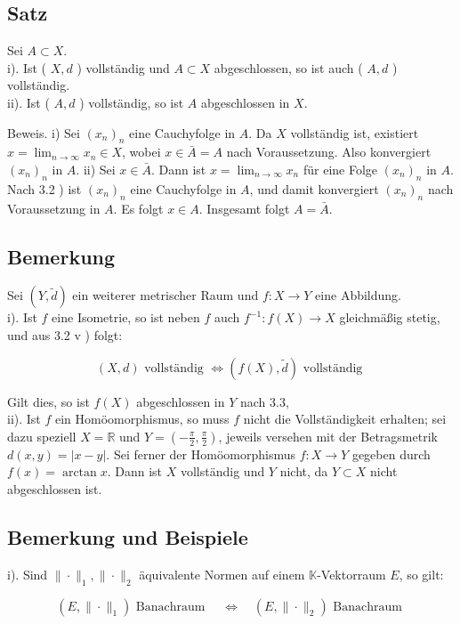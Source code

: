 \documentclass[10pt, letterpaper]{article}
\begin{document}
\subsection*{Satz}
Sei $A \subset X$.\\
i). Ist ( $X, d$ ) vollständig und $A \subset X$ abgeschlossen, so ist auch ( $A, d$ ) vollständig.\\
ii). Ist ( $A, d$ ) vollständig, so ist $A$ abgeschlossen in $X$.

Beweis. i) Sei $\left(x_{n}\right)_{n}$ eine Cauchyfolge in $A$. Da $X$ vollständig ist, existiert $x= \lim _{n \rightarrow \infty} x_{n} \in X$, wobei $x \in \bar{A}=A$ nach Voraussetzung. Also konvergiert $\left(x_{n}\right)_{n}$ in $A$. ii) Sei $x \in \bar{A}$. Dann ist $x=\lim _{n \rightarrow \infty} x_{n}$ für eine Folge $\left(x_{n}\right)_{n}$ in $A$. Nach 3.2 ) ist $\left(x_{n}\right)_{n}$ eine Cauchyfolge in $A$, und damit konvergiert $\left(x_{n}\right)_{n}$ nach Voraussetzung in $A$. Es folgt $x \in A$. Insgesamt folgt $A=\bar{A}$.

\subsection*{Bemerkung}
Sei $(Y, \tilde{d})$ ein weiterer metrischer Raum und $f: X \rightarrow Y$ eine Abbildung.\\
i). Ist $f$ eine Isometrie, so ist neben $f$ auch $f^{-1}: f(X) \rightarrow X$ gleichmäßig stetig, und aus 3.2 v ) folgt:

$$
(X, d) \text { vollständig } \Longleftrightarrow(f(X), \tilde{d}) \text { vollständig }
$$

Gilt dies, so ist $f(X)$ abgeschlossen in $Y$ nach 3.3,\\
ii). Ist $f$ ein Homöomorphismus, so muss $f$ nicht die Vollständigkeit erhalten; sei dazu speziell $X=\mathbb{R}$ und $Y=\left(-\frac{\pi}{2}, \frac{\pi}{2}\right)$, jeweils versehen mit der Betragsmetrik $d(x, y)=|x-y|$. Sei ferner der Homöomorphismus $f: X \rightarrow Y$ gegeben durch $f(x)=\arctan x$. Dann ist $X$ vollständig und $Y$ nicht, da $Y \subset X$ nicht abgeschlossen ist.

\subsection*{Bemerkung und Beispiele}
i). Sind $\|\cdot\|_{1},\|\cdot\|_{2}$ äquivalente Normen auf einem $\mathbb{K}$-Vektorraum $E$, so gilt:

$$
\left(E,\|\cdot\|_{1}\right) \text { Banachraum } \quad \Longleftrightarrow \quad\left(E,\|\cdot\|_{2}\right) \text { Banachraum }
$$
\end{document}
